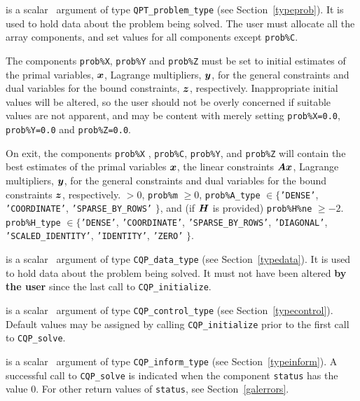 \documentclass{galahad}
\newcommand{\packagename}{CQP}
\begin{document}
\begin{description}
 is a scalar \intentinout\ argument of type
{\tt QPT\_problem\_type}
(see Section~\ref{typeprob}).
It is used to hold data about the problem being solved.
The user must allocate all the array components,
and set values for all components except {\tt prob\%C}.

The components {\tt prob\%X}, {\tt prob\%Y} and {\tt prob\%Z}
must be set to initial estimates of the primal variables, ${\bm{x}}$,
Lagrange multipliers, ${\bm{y}}$, for the general constraints
and dual variables for the bound constraints, ${\bm{z}}$, respectively.
Inappropriate initial values will be altered, so the user should
not be overly concerned if suitable values are not apparent, and may be
content with merely setting {\tt prob\%X=0.0}, {\tt prob\%Y=0.0}
and {\tt prob\%Z=0.0}.

On exit, the components {\tt prob\%X} , {\tt prob\%C}, {\tt prob\%Y},
and {\tt prob\%Z}
will contain the best estimates of the primal variables ${\bm{x}}$,
the linear constraints ${\bm{A}} {\bm{x}}$,
Lagrange multipliers, ${\bm{y}}$, for the general constraints
and dual variables for the bound constraints ${\bm{z}}$, respectively.
 $> 0$, {\tt prob\%m} $\geq 0$,
 {\tt prob\%A\_type} $\in \{${\tt 'DENSE'},
 {\tt 'COORDINATE'}, {\tt 'SPARSE\_BY\_\-ROWS'} $\}$,
              and (if ${\bm{H}}$ is provided) {\tt prob\%H\%ne} $\geq -2$.
 {\tt prob\%H\_type} $\in \{${\tt 'DENSE'},
 {\tt 'COORDINATE'}, {\tt 'SPARSE\_BY\_\-ROWS'}, {\tt 'DIAGONAL'},
 {\tt 'SCALED\_IDENTITY'}, {\tt 'IDENTITY'}, {\tt 'ZERO'} $\}$.

 is a scalar \intentinout\ argument of type
{\tt \packagename\_data\_type}
(see Section~\ref{typedata}). It is used to hold data about the problem being
solved. It must not have been altered {\bf by the user} since the last call to
{\tt \packagename\_initialize}.

 is a scalar \intentin\ argument of type
{\tt \packagename\_control\_type}
(see Section~\ref{typecontrol}). Default values may be assigned by calling
{\tt \packagename\_initialize} prior to the first call to
{\tt \packagename\_solve}.

 is a scalar \intentinout\ argument of type
{\tt \packagename\_inform\_type}
(see Section~\ref{typeinform}).
A successful call to
{\tt \packagename\_solve}
is indicated when the  component {\tt status} has the value 0.
For other return values of {\tt status}, see Section~\ref{galerrors}.


\end{description}
\end{document}
